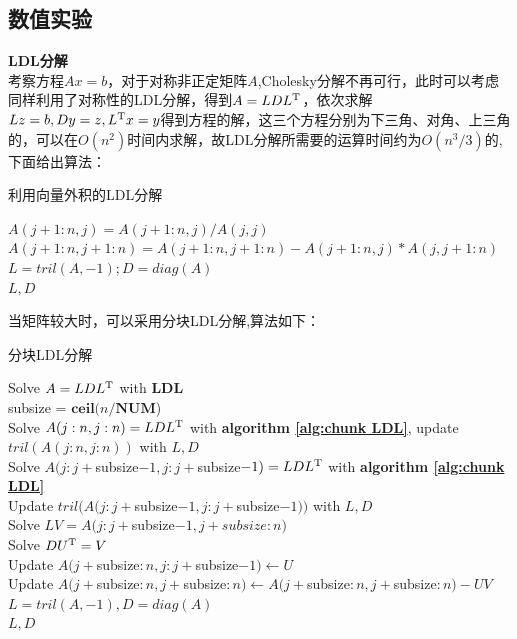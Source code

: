 \documentclass[12pt,fontset=mac]{ctexart}
\begin{document}
\subsection{数值实验}
\noindent \textbf{LDL分解}\\
考察方程$Ax=b$，对于对称非正定矩阵$A$,Cholesky分解不再可行，此时可以考虑同样利用了对称性的LDL分解，得到$A=LDL^{\rm T}$，依次求解$Lz=b,Dy=z,L^{\rm T} x=y$得到方程的解，这三个方程分别为下三角、对角、上三角的，可以在$O(n^2)$时间内求解，故LDL分解所需要的运算时间约为$O(n^3/3)$的,下面给出算法：\\
\begin{algorithm}[H]
	\caption{利用向量外积的LDL分解}  
	\label{alg:gaxpy ldl}
	{ 
		$A(j+1:n,j) = A(j+1:n,j)/A(j,j)$\\
		$A(j+1:n,j+1:n) = A(j+1:n,j+1:n)-A(j+1:n,j)*A(j,j+1:n)$\\	
	}  
	$L = tril(A,-1); D = diag(A)$\\
	\Return $L,D$\;
\end{algorithm}
当矩阵较大时，可以采用分块LDL分解,算法如下：\\
\begin{algorithm}[H]
	\caption{分块LDL分解}  
	\label{alg:chunk LDL}
	{
			Solve $A=LDL^{\rm T}$ with  \textbf{LDL}\\
	}  
	subsize = $\textbf{ceil}(n/\textbf{NUM}$)\\
	{ 
		{
			Solve $ A(j:n,j:n) = LDL^{\rm T} $ with \textbf{algorithm \ref{alg:chunk LDL}}, update $ tril(A(j:n,j:n))$ with $ L,D$\\
		}
		\Else
		{
			Solve $A(j:j+$subsize$-1,j:j+$subsize$-1) = LDL^{\rm T}$ with \textbf{algorithm \ref{alg:chunk LDL}}\\
			Update $tril(A(j:j+$subsize$-1,j:j+$subsize$-1)) $ with $ L,D$\\
			Solve $ LV= A(j:j+$subsize$-1,j+subsize:n) $\\
			Solve $ DU^{\rm T} = V $\\
			Update $A(j+$subsize$:n,j:j+$subsize$-1)\gets U $\\
			Update $A(j+$subsize$:n,j+$subsize$:n)\gets A(j+$subsize$:n,j+$subsize$:n)-UV$\\						
		}	
	} 
 	$L = tril(A,-1),D=diag(A)$\\
	\Return $L,D$\;
\end{algorithm}
\end{document}
